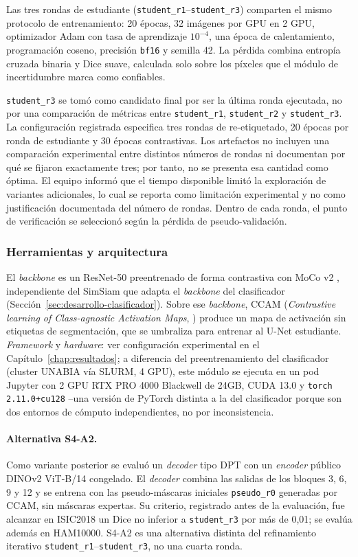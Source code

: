 Las tres rondas de estudiante (\texttt{student\_r1}--\texttt{student\_r3}) comparten el mismo protocolo de entrenamiento: 20 épocas, 32 imágenes por GPU en 2 GPU, optimizador Adam con tasa de aprendizaje $10^{-4}$, una época de calentamiento, programación coseno, precisión \texttt{bf16} y semilla 42. La pérdida combina entropía cruzada binaria y Dice suave, calculada solo sobre los píxeles que el módulo de incertidumbre marca como confiables.

\texttt{student\_r3} se tomó como candidato final por ser la última ronda ejecutada, no por una comparación de métricas entre \texttt{student\_r1}, \texttt{student\_r2} y \texttt{student\_r3}. La configuración registrada especifica tres rondas de re-etiquetado, 20 épocas por ronda de estudiante y 30 épocas contrastivas. Los artefactos no incluyen una comparación experimental entre distintos números de rondas ni documentan por qué se fijaron exactamente tres; por tanto, no se presenta esa cantidad como óptima. El equipo informó que el tiempo disponible limitó la exploración de variantes adicionales, lo cual se reporta como limitación experimental y no como justificación documentada del número de rondas. Dentro de cada ronda, el punto de verificación se seleccionó según la pérdida de pseudo-validación.

\subsubsection{Herramientas y arquitectura}

El \textit{backbone} es un ResNet-50 preentrenado de forma contrastiva con MoCo v2 \parencite{chen2020mocov2}, independiente del SimSiam que adapta el \textit{backbone} del clasificador (Sección~\ref{sec:desarrollo-clasificador}). Sobre ese \textit{backbone}, CCAM (\emph{Contrastive learning of Class-agnostic Activation Maps}, \parencite{xie2022ccam}) produce un mapa de activación sin etiquetas de segmentación, que se umbraliza para entrenar al U-Net estudiante. \textit{Framework} y \textit{hardware}: ver configuración experimental en el Capítulo~\ref{chap:resultados}; a diferencia del preentrenamiento del clasificador (cluster UNABIA vía SLURM, 4 GPU), este módulo se ejecuta en un pod Jupyter con 2 GPU RTX PRO 4000 Blackwell de 24GB, CUDA 13.0 y \texttt{torch 2.11.0+cu128} --una versión de PyTorch distinta a la del clasificador porque son dos entornos de cómputo independientes, no por inconsistencia.

\paragraph{Alternativa S4-A2.} Como variante posterior se evaluó un \textit{decoder} tipo DPT con un \textit{encoder} público DINOv2 ViT-B/14 congelado. El \textit{decoder} combina las salidas de los bloques 3, 6, 9 y 12 y se entrena con las pseudo-máscaras iniciales \texttt{pseudo\_r0} generadas por CCAM, sin máscaras expertas. Su criterio, registrado antes de la evaluación, fue alcanzar en ISIC2018 un Dice no inferior a \texttt{student\_r3} por más de 0,01; se evalúa además en HAM10000. S4-A2 es una alternativa distinta del refinamiento iterativo \texttt{student\_r1}--\texttt{student\_r3}, no una cuarta ronda.

